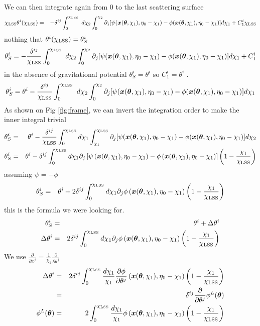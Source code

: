 \documentclass[a4paper, 11pt]{article}
\def\ba{\begin{eqnarray}}
\def\ea{\end{eqnarray}}
\begin{document}
We can then integrate again from 0 to the last scattering surface 
\ba
\chi_{\rm LSS} \theta^{i}(\chi_{\rm LSS}) &=&  - \delta^{ij}  \int^{\chi_{\rm LSS}}_{0} d \chi_{2} \int^{\chi_{2}}_{0} \partial_{j} [\psi(\bm{x}(\bm{\theta}, \chi_{1}), \eta_{0}-\chi_{1}) -\phi(\bm{x}(\bm{\theta}, \chi_{1}), \eta_{0}-\chi_{1})]  d\chi_{1} + C^{i}_{1}\chi_{ \rm LSS} \nonumber
\ea
nothing that $\theta^{i}(\chi_{\rm LSS}) = \theta^{i}_{S}$
\ba
 \theta^{i}_{S} =  - \frac{\delta^{ij}  }{\chi_{\rm LSS} } \int^{\chi_{\rm LSS}}_{0} d \chi_{2} \int^{\chi_{2}}_{0} \partial_{j} [\psi( \bm{x}(\bm{\theta}, \chi_{1}), \eta_{0}-\chi_{1}) -\phi( \bm{x}(\bm{\theta}, \chi_{1}), \eta_{0}-\chi_{1})]  d\chi_{1} + C^{i}_{1}
\ea
in the absence of gravitational potential $ \theta^{i}_{S} =  \theta^{i}$ so $C^{i}_{1} = \theta^{i}$ .
\ba
 \theta^{i}_{S} =  \theta^{i} - \frac{\delta^{ij}  }{\chi_{\rm LSS} } \int^{\chi_{\rm LSS} }_{0} d \chi_{2} \int^{\chi_{2}}_{0} \partial_{j} [\psi( \bm{x}(\bm{\theta}, \chi_{1}), \eta_{0}-\chi_{1}) -\phi( \bm{x}(\bm{\theta}, \chi_{1}), \eta_{0}-\chi_{1})]  d\chi_{1} 
\ea
As shown on Fig \ref{fig:frame}, we can invert the integration order to make the inner integral trivial
\ba
 \theta^{i}_{S}  &=&  \theta^{i} - \frac{\delta^{ij}  }{\chi_{\rm LSS} } \int^{\chi_{\rm LSS}}_{0} d\chi_{1} \int^{\chi_{\rm LSS}}_{\chi_{1}}  \partial_{j} [\psi( \bm{x}(\bm{\theta}, \chi_{1}), \eta_{0}-\chi_{1}) -\phi( \bm{x}(\bm{\theta}, \chi_{1}), \eta_{0}-\chi_{1})]  d\chi_{2} \\
 \theta^{i}_{S} &=&  \theta^{i} - \delta^{ij}  \int^{\chi_{\rm LSS}}_{0} d\chi_{1} \partial_{j} \left[\psi\left(\bm{x}(\bm{\theta}, \chi_{1}), \eta_{0}-\chi_{1} \right) -\phi \left( \bm{x}(\bm{\theta}, \chi_{1}), \eta_{0}-\chi_{1} \right) \right]  \left(1 - \frac{\chi_{1}}{\chi_{\rm LSS} } \right)  
\ea
assuming $ \psi = - \phi$ 
\ba
 \theta^{i}_{S} &=&  \theta^{i} + 2 \delta^{ij}  \int^{\chi_{\rm LSS}}_{0} d\chi_{1} \partial_{j} \phi \left( \bm{x}(\bm{\theta}, \chi_{1}), \eta_{0}-\chi_{1} \right)  \left(1 - \frac{\chi_{1}}{\chi_{\rm LSS} } \right)  
\ea
this is the formula we were looking for.
\ba
 \theta^{i}_{S}  &=&   \theta^{i} + \Delta  \theta^{i} \\
 \Delta  \theta^{i} &=& 2 \delta^{ij}  \int^{\chi_{\rm LSS}}_{0} d\chi_{1} \partial_{j} \phi \left( \bm{x}(\bm{\theta}, \chi_{1}), \eta_{0}-\chi_{1} \right)  \left(1 - \frac{\chi_{1}}{\chi_{\rm LSS} } \right)  
\ea
We use $\frac{\partial}{\partial x^{j}} = \frac{1}{\chi_{1}} \frac{\partial}{\partial \theta^{j}}$
\ba
 \Delta  \theta^{i} &=& 2 \delta^{ij}  \int^{\chi_{\rm LSS}}_{0} \frac{d\chi_{1}}{\chi_{1}} \frac{\partial \phi}{\partial \theta^{j}}  \left( \bm{x}(\bm{\theta}, \chi_{1}), \eta_{0}-\chi_{1} \right)  \left(1 - \frac{\chi_{1}}{\chi_{\rm LSS} } \right)   \\
  &=& \delta^{ij} \frac{\partial }{\partial \theta^{j}} \phi^{L}(\bm{\theta}) \\
  \phi^{L}(\bm{\theta}) &=&  2 \int^{\chi_{\rm LSS}}_{0} \frac{d\chi_{1}}{\chi_{1}}  \phi \left( \bm{x}(\bm{\theta}, \chi_{1}), \eta_{0}-\chi_{1} \right)  \left(1 - \frac{\chi_{1}}{\chi_{\rm LSS} } \right)
\ea
\end{document}
